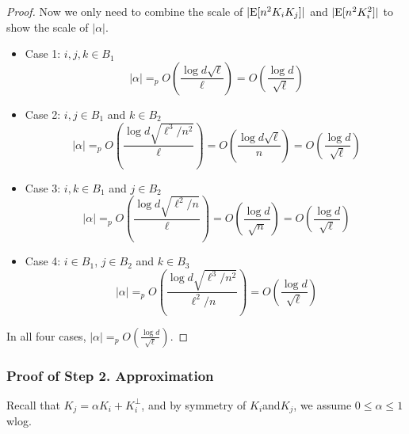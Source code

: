 \begin{proof}

Now we only need to combine the scale of $|\mathrm{E}[n^2K_i K_j]|$ and $|\mathrm{E}[n^2K^2_i]|$ to show the scale of $|\alpha|$.
\begin{itemize} 
    \item Case 1: $i,j,k \in B_1$
    \begin{equation}~\label{eqn:alphabound1}
        |\alpha| =_p O\left(\frac{\log d \sqrt{\ell}}{\ell} \right) = O\left(\frac{\log d }{\sqrt{\ell}} \right)
    \end{equation}
    \item Case 2: $i,j \in B_1$ and $k \in B_2$
    \begin{equation} ~\label{eqn:alphabound2}
        |\alpha| =_p O\left(\frac{\log d \sqrt{\ell^3/n^2}}{\ell} \right) = O\left(\frac{\log d \sqrt{\ell}}{n} \right) = O\left(\frac{\log d }{\sqrt{\ell}} \right)
    \end{equation}
    \item Case 3: $i,k \in B_1$ and $j \in B_2$
    \begin{equation} ~\label{eqn:alphabound3}
        |\alpha| =_p O\left(\frac{\log d \sqrt{\ell^2/n}}{\ell} \right) = O\left(\frac{\log d }{\sqrt{n}} \right) =  O\left(\frac{\log d }{\sqrt{\ell}} \right)
    \end{equation}
    \item Case 4: $i \in B_1$, $j \in B_2$ and $k \in B_3$
    \begin{equation} ~\label{eqn:alphabound4}
        |\alpha| =_p O\left(\frac{\log d \sqrt{\ell^3/n^2}}{\ell^2/n} \right) =   O\left(\frac{\log d }{\sqrt{\ell}} \right)
    \end{equation}
\end{itemize}
In all four cases, $|\alpha| =_p O\left(\frac{\log d }{\sqrt{\ell}} \right)$.

\end{proof}


\subsubsection{Proof of Step 2. Approximation}


Recall that $K_j = \alpha K_i + K_i^{\bot}$, and by symmetry of $K_i $and$ K_j$, we assume $0\leq \alpha \leq 1$ wlog. 

